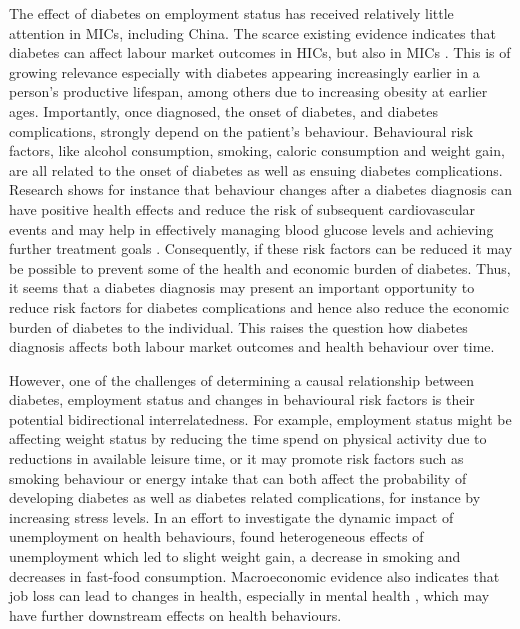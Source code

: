 The effect of diabetes on employment status has received relatively little attention in \acp{MIC}, including China. The scarce existing evidence indicates that diabetes can affect labour market outcomes in \acp{HIC}, but also in \acp{MIC} \parencite{Seuring2016}. This is of growing relevance especially with diabetes appearing increasingly earlier in a person's productive lifespan, among others due to increasing obesity at earlier ages. Importantly, once diagnosed, the onset of diabetes, and diabetes complications, strongly depend on the patient's behaviour. Behavioural risk factors, like alcohol consumption, smoking, caloric consumption and weight gain, are all related to the onset of diabetes as well as ensuing diabetes complications. Research shows for instance that behaviour changes after a diabetes diagnosis can have positive health effects and reduce the risk of subsequent cardiovascular events \parencite{Long2014} and may help in effectively managing blood glucose levels and achieving further treatment goals \parencite{Zhou2016}. Consequently, if these risk factors can be reduced it may be possible to prevent some of the health and economic burden of diabetes. Thus, it seems that a diabetes diagnosis may present an important opportunity to reduce risk factors for diabetes complications \parencite{DeFineOlivarius2015} and hence also reduce the economic burden of diabetes to the individual. This raises the question how diabetes diagnosis affects both labour market outcomes and health behaviour over time.

However, one of the challenges of determining a causal relationship between  diabetes, employment status and changes in behavioural risk factors is their potential bidirectional interrelatedness. For example, employment status might be affecting weight status by reducing the time spend on physical activity due to reductions in available leisure time, or it may promote risk factors such as smoking behaviour or energy intake that can both affect the probability of developing diabetes as well as diabetes related complications, for instance by increasing stress levels. In an effort to  investigate the dynamic impact of unemployment on health behaviours, \textcite{Colman2014} found heterogeneous effects of unemployment which led to slight weight gain, a decrease in smoking and decreases in fast-food consumption. Macroeconomic evidence also indicates that job loss can lead to changes in health, especially in mental health \parencite{Charles2008}, which may have further downstream effects on health behaviours.

